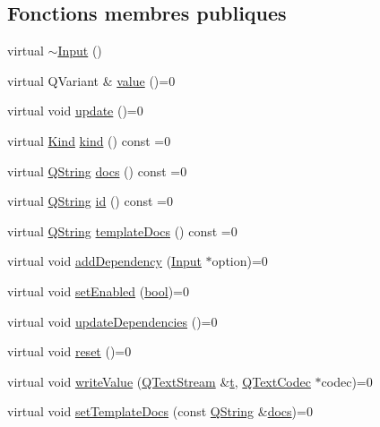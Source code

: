 \subsection*{Fonctions membres publiques}
\begin{DoxyCompactItemize}
\item 
virtual \hyperlink{class_input_a230646fa6e6433b4d9ac3535b7d52087}{$\sim$\+Input} ()
\item 
virtual Q\+Variant \& \hyperlink{class_input_a72c6ccd2eff708b1f91b8503427ec312}{value} ()=0
\item 
virtual void \hyperlink{class_input_a0436098ba644b5a7f643dd0c2d33d26a}{update} ()=0
\item 
virtual \hyperlink{class_input_a4138334795f6330759839617744e20a9}{Kind} \hyperlink{class_input_ae5753682055225699b21f97354a317f0}{kind} () const  =0
\item 
virtual \hyperlink{class_q_string}{Q\+String} \hyperlink{class_input_af0cf2f0042064e90ccabe2d8b55f2a45}{docs} () const  =0
\item 
virtual \hyperlink{class_q_string}{Q\+String} \hyperlink{class_input_a5b54bd6c8aa55a0cdf892594766e6dbe}{id} () const  =0
\item 
virtual \hyperlink{class_q_string}{Q\+String} \hyperlink{class_input_aa080eb91625dc520aa3fe873b5f576da}{template\+Docs} () const  =0
\item 
virtual void \hyperlink{class_input_ac7db8341f42bd6313fc5370f8dea0394}{add\+Dependency} (\hyperlink{class_input}{Input} $\ast$option)=0
\item 
virtual void \hyperlink{class_input_a29e1927059a522781963fc8d0a872822}{set\+Enabled} (\hyperlink{qglobal_8h_a1062901a7428fdd9c7f180f5e01ea056}{bool})=0
\item 
virtual void \hyperlink{class_input_a8758a9e88aecbbd9be1d438ba5b8454c}{update\+Dependencies} ()=0
\item 
virtual void \hyperlink{class_input_a2456add66c0c39982467a6a376c057fb}{reset} ()=0
\item 
virtual void \hyperlink{class_input_a761f73fb00d6e0e3e391edafcfde1134}{write\+Value} (\hyperlink{class_q_text_stream}{Q\+Text\+Stream} \&\hyperlink{058__bracket__recursion_8tcl_a69e959f6901827e4d8271aeaa5fba0fc}{t}, \hyperlink{class_q_text_codec}{Q\+Text\+Codec} $\ast$codec)=0
\item 
virtual void \hyperlink{class_input_a88188054c6f323aa45226c91101850d9}{set\+Template\+Docs} (const \hyperlink{class_q_string}{Q\+String} \&\hyperlink{class_input_af0cf2f0042064e90ccabe2d8b55f2a45}{docs})=0
\end{DoxyCompactItemize}



